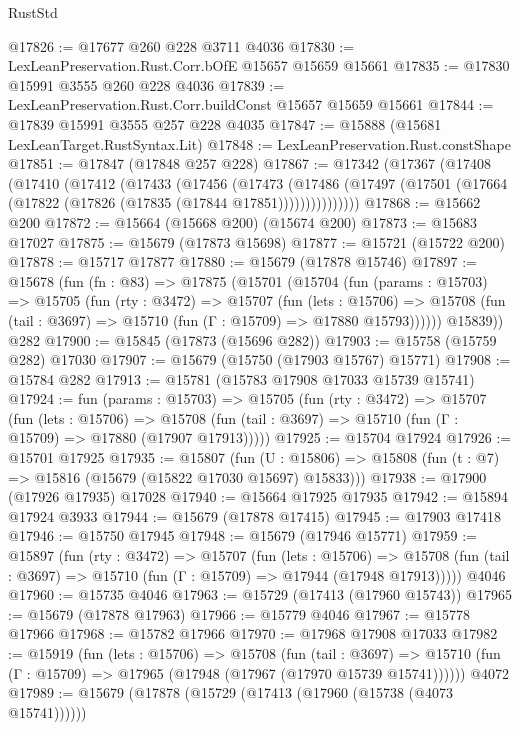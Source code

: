 \begin{lexlean}{RustStd}
\begin{coremodule}
@17826 := @17677 @260 @228 @3711 @4036
@17830 := LexLeanPreservation.Rust.Corr.bOfE @15657 @15659 @15661
@17835 := @17830 @15991 @3555 @260 @228 @4036
@17839 := LexLeanPreservation.Rust.Corr.buildConst @15657 @15659 @15661
@17844 := @17839 @15991 @3555 @257 @228 @4035
@17847 := @15888 (@15681 LexLeanTarget.RustSyntax.Lit)
@17848 := LexLeanPreservation.Rust.constShape
@17851 := @17847 (@17848 @257 @228)
@17867 := @17342
    (@17367
      (@17408
        (@17410
          (@17412
            (@17433
              (@17456
                (@17473
                  (@17486
                    (@17497 (@17501 (@17664 (@17822 (@17826 (@17835 (@17844 @17851)))))))))))))))
@17868 := @15662 @200
@17872 := @15664 (@15668 @200) (@15674 @200)
@17873 := @15683 @17027
@17875 := @15679 (@17873 @15698)
@17877 := @15721 (@15722 @200)
@17878 := @15717 @17877
@17880 := @15679 (@17878 @15746)
@17897 := @15678
    (fun (fn : @83) =>
    @17875
      (@15701
        (@15704
          (fun (params : @15703) =>
          @15705
            (fun (rty : @3472) =>
            @15707
              (fun (lets : @15706) =>
              @15708 (fun (tail : @3697) => @15710 (fun (Γ : @15709) => @17880 @15793))))))
        @15839))
    @282
@17900 := @15845 (@17873 (@15696 @282))
@17903 := @15758 (@15759 @282) @17030
@17907 := @15679 (@15750 (@17903 @15767) @15771)
@17908 := @15784 @282
@17913 := @15781 (@15783 @17908 @17033 @15739 @15741)
@17924 := fun (params : @15703) =>
  @15705
    (fun (rty : @3472) =>
    @15707
      (fun (lets : @15706) =>
      @15708 (fun (tail : @3697) => @15710 (fun (Γ : @15709) => @17880 (@17907 @17913)))))
@17925 := @15704 @17924
@17926 := @15701 @17925
@17935 := @15807
    (fun (U : @15806) => @15808 (fun (t : @7) => @15816 (@15679 (@15822 @17030 @15697) @15833)))
@17938 := @17900 (@17926 @17935) @17028
@17940 := @15664 @17925 @17935
@17942 := @15894 @17924 @3933
@17944 := @15679 (@17878 @17415)
@17945 := @17903 @17418
@17946 := @15750 @17945
@17948 := @15679 (@17946 @15771)
@17959 := @15897
    (fun (rty : @3472) =>
    @15707
      (fun (lets : @15706) =>
      @15708 (fun (tail : @3697) => @15710 (fun (Γ : @15709) => @17944 (@17948 @17913)))))
    @4046
@17960 := @15735 @4046
@17963 := @15729 (@17413 (@17960 @15743))
@17965 := @15679 (@17878 @17963)
@17966 := @15779 @4046
@17967 := @15778 @17966
@17968 := @15782 @17966
@17970 := @17968 @17908 @17033
@17982 := @15919
    (fun (lets : @15706) =>
    @15708
      (fun (tail : @3697) =>
      @15710 (fun (Γ : @15709) => @17965 (@17948 (@17967 (@17970 @15739 @15741))))))
    @4072
@17989 := @15679 (@17878 (@15729 (@17413 (@17960 (@15738 (@4073 @15741))))))

\end{coremodule}
\end{lexlean}

